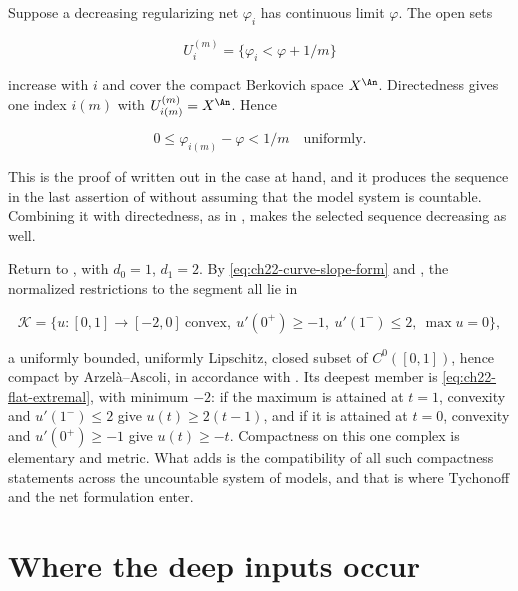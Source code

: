 \begin{example}
\label{ex:ch22-dini-selection}
Suppose a decreasing regularizing net $\varphi_i$ has continuous limit
$\varphi$.  The open sets

\[
                     U_i^{(m)}=\{\varphi_i<\varphi+1/m\}
\]

increase with $i$ and cover the compact Berkovich space $X^{\An}$.
Directedness gives one index $i(m)$ with
$U_{i(m)}^{(m)}=X^{\An}$.  Hence

\[
             0\leq\varphi_{i(m)}-\varphi<1/m
             \quad\text{uniformly}.
\]

This is the proof of  written out in the case at hand,
and it produces the sequence in the last assertion of
 without assuming that the model
system is countable.  Combining it with directedness, as in
, makes the selected sequence
decreasing as well.
\end{example}

\begin{example}
\label{ex:ch22-compactness-segment}
Return to , with $d_0=1$, $d_1=2$.  By
\eqref{eq:ch22-curve-slope-form} and
, the normalized restrictions to the
segment all lie in

\[
 \mathcal K=\bigl\{u:[0,1]\to[-2,0]\ \text{convex},\
       u'(0^+)\geq-1,\ u'(1^-)\leq2,\ \max u=0\bigr\},
\]

a uniformly bounded, uniformly Lipschitz, closed subset of
$C^0([0,1])$, hence compact by Arzel\`a--Ascoli, in accordance with
\Cref{cor:ch22-arzela-ascoli}.  Its deepest member is
\eqref{eq:ch22-flat-extremal}, with minimum $-2$: if the maximum is
attained at $t=1$, convexity and $u'(1^-)\leq2$ give
$u(t)\geq2(t-1)$, and if it is attained at $t=0$, convexity and
$u'(0^+)\geq-1$ give $u(t)\geq-t$.  Compactness on
this one complex is elementary and metric.  What
 adds is the compatibility of all such
compactness statements across the uncountable system of models, and that is
where Tychonoff and the net formulation enter.
\end{example}

\section{Where the deep inputs occur}
\label{sec:ch22-ledger}

